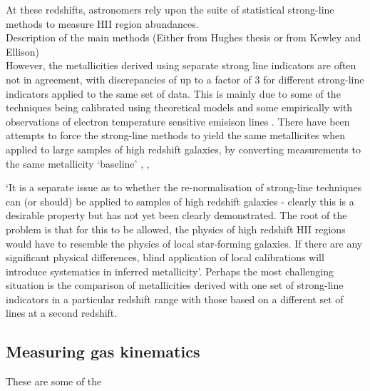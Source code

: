 \documentclass{literature}
\begin{document}
At these redshifts, astronomers rely upon the suite of statistical strong-line methods to measure HII region abundances. \\

Description of the main methods (Either from Hughes thesis or from Kewley and Ellison) \\ 

However, the metallicities derived using separate strong line indicators are often not in agreement, with discrepancies of up to a factor of 3 for different strong-line indicators applied to the same set of data. This is mainly due to some of the techniques being calibrated using theoretical models and some empirically with observations of electron temperature sensitive emisison lines \citep{Stasinska2005}. There have been attempts to force the strong-line methods to yield the same metallicites when applied to large samples of high redshift galaxies, by converting measurements to the same metallicity `baseline' \citep{Kewley_2008}, \citep{Kewley2002}, \citep{Maiolino2008}

`It is a separate issue as to whether the re-normalisation of strong-line techniques can (or should) be applied to samples of high redshift galaxies - clearly this is a desirable property but has not yet been clearly demonstrated. The root of the problem is that for this to be allowed, the physics of high redshift HII regions would have to resemble the physics of local star-forming galaxies. If there are any significant physical differences, blind application of local calibrations will introduce systematics in inferred metallicity'. Perhaps the most challenging situation is the comparison of metallicities derived with one set of strong-line indicators in a particular redshift range with those based on a different set of lines at a second redshift. 




\subsection{Measuring gas kinematics}

These are some of the 
\end{document}
